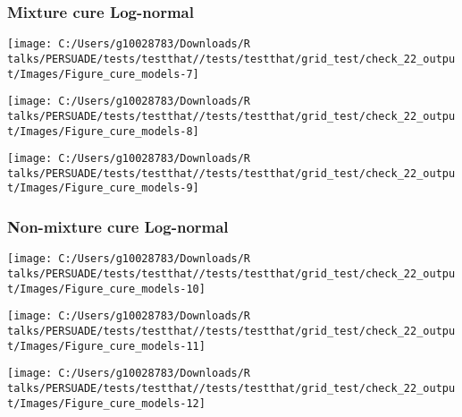 \documentclass[
]{article}
\begin{document}
\clearpage

\subsubsection{Mixture cure Log-normal}\label{mixture-cure-log-normal}

\begin{flushleft}\texttt{[image: C:/Users/g10028783/Downloads/R talks/PERSUADE/tests/testthat//tests/testthat/grid\_test/check\_22\_output/Images/Figure\_cure\_models-7]} \end{flushleft}

\begin{flushleft}\texttt{[image: C:/Users/g10028783/Downloads/R talks/PERSUADE/tests/testthat//tests/testthat/grid\_test/check\_22\_output/Images/Figure\_cure\_models-8]} \end{flushleft}

\begin{flushleft}\texttt{[image: C:/Users/g10028783/Downloads/R talks/PERSUADE/tests/testthat//tests/testthat/grid\_test/check\_22\_output/Images/Figure\_cure\_models-9]} \end{flushleft}

\clearpage

\subsubsection{Non-mixture cure
Log-normal}\label{non-mixture-cure-log-normal}

\begin{flushleft}\texttt{[image: C:/Users/g10028783/Downloads/R talks/PERSUADE/tests/testthat//tests/testthat/grid\_test/check\_22\_output/Images/Figure\_cure\_models-10]} \end{flushleft}

\begin{flushleft}\texttt{[image: C:/Users/g10028783/Downloads/R talks/PERSUADE/tests/testthat//tests/testthat/grid\_test/check\_22\_output/Images/Figure\_cure\_models-11]} \end{flushleft}

\begin{flushleft}\texttt{[image: C:/Users/g10028783/Downloads/R talks/PERSUADE/tests/testthat//tests/testthat/grid\_test/check\_22\_output/Images/Figure\_cure\_models-12]} \end{flushleft}
\end{document}
